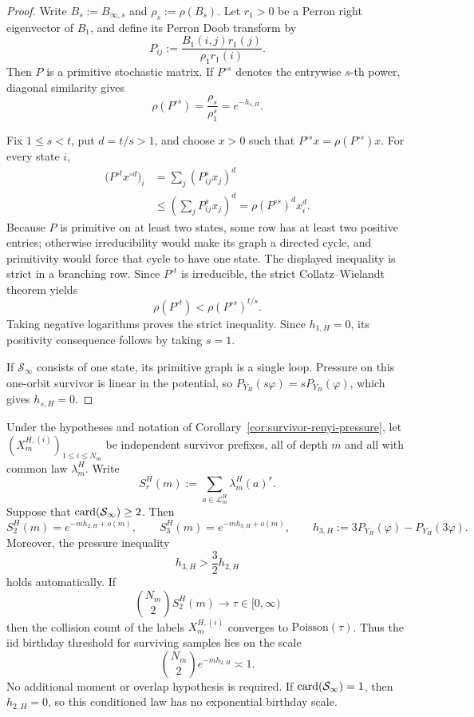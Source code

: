 \begin{proof}
Write \(B_s:=B_{\infty,s}\) and \(\rho_s:=\rho(B_s)\).  Let
\(r_1>0\) be a Perron right eigenvector of \(B_1\), and define its
Perron Doob transform by
\[
  P_{ij}:=\frac{B_1(i,j)r_1(j)}{\rho_1r_1(i)}.
\]
Then \(P\) is a primitive stochastic matrix.  If \(P^{\circ s}\)
denotes the entrywise \(s\)-th power, diagonal similarity gives
\[
  \rho(P^{\circ s})=\frac{\rho_s}{\rho_1^s}=e^{-h_{s,H}}.
\]

Fix \(1\leq s<t\), put \(d=t/s>1\), and choose \(x>0\) such that
\(P^{\circ s}x=\rho(P^{\circ s})x\).  For every state \(i\),
\begin{align*}
  \bigl(P^{\circ t}x^{\circ d}\bigr)_i
  &=\sum_j(P_{ij}^s x_j)^d\\
  &\leq\left(\sum_jP_{ij}^s x_j\right)^d
   =\rho(P^{\circ s})^d x_i^d.
\end{align*}
Because \(P\) is primitive on at least two states, some row has at
least two positive entries; otherwise irreducibility would make its
graph a directed cycle, and primitivity would force that cycle to have
one state.  The displayed inequality is strict in a branching row.
Since \(P^{\circ t}\) is irreducible, the strict
Collatz--Wielandt theorem yields
\[
  \rho(P^{\circ t})<\rho(P^{\circ s})^{t/s}.
\]
Taking negative logarithms proves the strict inequality.  Since
\(h_{1,H}=0\), its positivity consequence follows by taking \(s=1\).

If \(\mathcal S_\infty\) consists of one state, its primitive graph is
a single loop.  Pressure on this one-orbit survivor is linear in the
potential, so \(P_{Y_H}(s\varphi)=sP_{Y_H}(\varphi)\), which gives
\(h_{s,H}=0\).
\end{proof}

\begin{corollary}
\label{cor:survivor-spectrum-collision}
Under the hypotheses and notation of
Corollary~\ref{cor:survivor-renyi-pressure}, let
\((X_m^{H,(i)})_{1\leq i\leq N_m}\) be independent survivor prefixes,
all of depth \(m\) and all with common law \(\lambda_m^H\).  Write
\[
  S_r^H(m):=\sum_{a\in\mathcal L_m^H}\lambda_m^H(a)^r.
\]
Suppose that \(\operatorname{card}(\mathcal S_\infty)\geq2\).  Then
\[
  S_2^H(m)=e^{-m h_{2,H}+o(m)},
  \qquad
  S_3^H(m)
  = e^{-m h_{3,H}+o(m)},
  \qquad
  h_{3,H}:=3P_{Y_H}(\varphi)-P_{Y_H}(3\varphi).
\]
Moreover, the pressure inequality
\[
  h_{3,H}>\frac32h_{2,H}
\]
holds automatically.  If
\[
  \binom{N_m}{2}S_2^H(m)\to\tau\in[0,\infty)
\]
then the collision count of the labels \(X_m^{H,(i)}\) converges to
\(\mathrm{Poisson}(\tau)\).  Thus the iid birthday threshold for
surviving samples lies on the scale
  \[
    \binom{N_m}{2}e^{-m h_{2,H}}\asymp 1.
  \]
No additional moment or overlap hypothesis is required.  If
\(\operatorname{card}(\mathcal S_\infty)=1\), then \(h_{2,H}=0\), so this conditioned
law has no exponential birthday scale.
\end{corollary}

